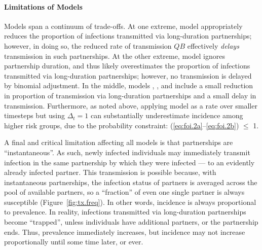 \paragraph{Limitations of Models }
Models  span a continuum of trade-offs.
At one extreme, model  appropriately reduces the proportion of infections
transmitted via long-duration partnerships;
however, in doing so, the reduced rate of transmission $QB$
effectively \emph{delays} transmission in such partnerships.
At the other extreme, model  ignores partnership duration,
and thus likely overestimates the proportion of infections
transmitted via long-duration partnerships;
however, no transmission is delayed by binomial adjustment.
In the middle, models , , and  include
a small reduction in proportion of transmission via long-duration partnerships
and a small delay in transmission.
Furthermore, as noted above,
applying model  as a rate over smaller timesteps but using $\Delta_t = 1$
can substantially underestimate incidence among higher risk groups,
due to the probability constraint: (\ref{eq:foi.2a}--\ref{eq:foi.2b}) $\le$ 1.
\par
A final and critical limitation affecting all models 
is that partnerships are ``instantaneous''.
As such, newly infected individuals may immediately transmit infection
in the same partnership by which they were infected --- to an evidently already infected partner.
This transmission is possible because, with instantaneous partnerships,
the infection status of partners is averaged across the pool of available partners,
so a ``fraction'' of even one single partner is always susceptible (Figure~\ref{fig:tx.freq}).
In other words, incidence is always proportional to prevalence.
In reality, infections transmitted via long-duration partnerships become ``trapped'',
unless individuals have additional partners, or the partnership ends.
Thus, prevalence immediately increases,
but incidence may not increase proportionally until some time later, or ever.
